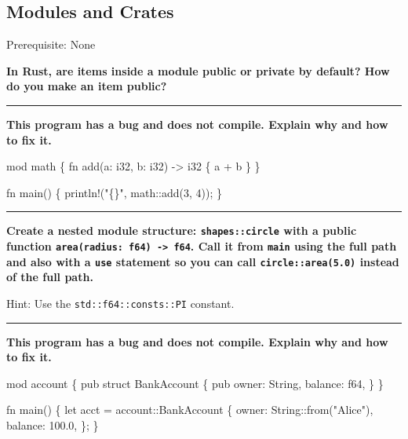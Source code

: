 \documentclass[
  11pt,
]{article}
\newenvironment{Shaded}{}{}
\newcommand{\NormalTok}[1]{#1}
\begin{document}
\subsection{Modules and Crates}\label{modules-and-crates}

Prerequisite: None

\textbf{In Rust, are items inside a module public or private by default?
How do you make an item public?}

\begin{center}\rule{0.5\linewidth}{0.5pt}\end{center}

\textbf{This program has a bug and does not compile. Explain why and how
to fix it.}

\begin{Shaded}
\begin{Highlighting}[]
\NormalTok{mod math \{}
\NormalTok{    fn add(a: i32, b: i32) {-}\textgreater{} i32 \{}
\NormalTok{        a + b}
\NormalTok{    \}}
\NormalTok{\}}

\NormalTok{fn main() \{}
\NormalTok{    println!("\{\}", math::add(3, 4));}
\NormalTok{\}}
\end{Highlighting}
\end{Shaded}

\begin{center}\rule{0.5\linewidth}{0.5pt}\end{center}

\textbf{Create a nested module structure: \texttt{shapes::circle} with a
public function \texttt{area(radius:\ f64)\ -\textgreater{}\ f64}. Call
it from \texttt{main} using the full path and also with a \texttt{use}
statement so you can call \texttt{circle::area(5.0)} instead of the full
path.}

Hint: Use the \texttt{std::f64::consts::PI} constant.

\begin{Shaded}
\begin{Highlighting}[]

\end{Highlighting}
\end{Shaded}

\begin{center}\rule{0.5\linewidth}{0.5pt}\end{center}

\textbf{This program has a bug and does not compile. Explain why and how
to fix it.}

\begin{Shaded}
\begin{Highlighting}[]
\NormalTok{mod account \{}
\NormalTok{    pub struct BankAccount \{}
\NormalTok{        pub owner: String,}
\NormalTok{        balance: f64,}
\NormalTok{    \}}
\NormalTok{\}}

\NormalTok{fn main() \{}
\NormalTok{    let acct = account::BankAccount \{}
\NormalTok{        owner: String::from("Alice"),}
\NormalTok{        balance: 100.0,}
\NormalTok{    \};}
\NormalTok{\}}
\end{Highlighting}
\end{Shaded}
\end{document}
